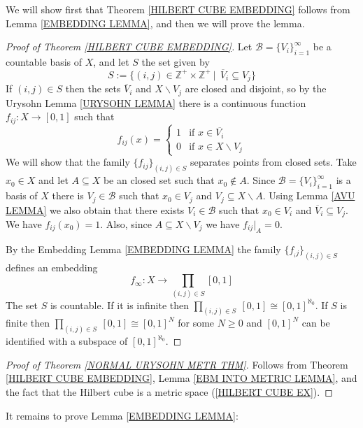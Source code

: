 \documentclass[11pt, letterpaper, oneside]{report}
\theoremstyle{pplain}
\newtheorem{ITERMVALUE THM}[theorem]{Intermediate Value Theorem}
\newtheorem{HEINEBOREL THM}[theorem]{Heine-Borel Theorem}
\newtheorem{UMETR THM}[theorem]{Urysohn Metrization Theorem}
\newtheorem{UMETR2 THM}[theorem]{Urysohn Metrization Theorem (v.2)}
\theoremstyle{ddefinition}
\theoremstyle{nnn}
\newtheorem{TDA NN}[theorem]{Topological Data Analysis. }
\theoremstyle{eexercise}
\newcommand{\Z}{{\mathbb Z}}
\newcommand{\BB}{{\mathcal B}}
\newcommand{\ssmin}{\smallsetminus}
\begin{document}
We will  show first that Theorem \ref{HILBERT CUBE EMBEDDING} follows from 
Lemma \ref{EMBEDDING LEMMA}, and then we will  prove the lemma.  


\begin{proof}[Proof of Theorem \ref{HILBERT CUBE EMBEDDING}]
Let $\BB= \{V_{i}\}_{i=1}^{\infty}$ be a countable basis of $X$, and let $S$ the set given by 
$$S := \{(i, j)\in \Z^{+}\times \Z^{+} \ | \ \ \overline{V}_{i} \subseteq V_{j} \}$$
 If $(i, j) \in S$ then the sets $\overline{V}_{i}$ and $X\ssmin V_{j}$ are closed and disjoint, 
so by the Urysohn Lemma  \ref{URYSOHN LEMMA} there is a continuous function 
$f_{ij} \colon X\to [0, 1]$ such that 
$$
f_{ij}(x) = 
\begin{cases}
1  & \text{if $x\in \overline{V_{i}}$} \\
0  & \text{if $x\in X\ssmin V_{j}$} 
\end{cases}
$$
We will show that the family $\{f_{ij}\}_{(i, j)\in S}$ separates points from closed sets. 
Take $x_{0}\in X$ and let $A\subseteq X$ be an closed  set
such that $x_{0}\not\in A$. 
Since $\BB= \{V_{i}\}_{i=1}^{\infty}$ is a basis of $X$ there is $V_{j}\in \BB$ such that 
$x_{0}\in V_{j}$ and $V_{j} \subseteq X\ssmin A$. 
Using Lemma \ref{AVU LEMMA} we also obtain that there exists 
$V_{i}\in \BB$ such that $x_{0}\in V_{i}$ and $\overline{V}_{i} \subseteq V_{j}$. We have 
$f_{ij}(x_{0}) =1$. Also, since $A\subseteq X\ssmin V_{j}$ we have $f_{ij}|_{A} = 0$. 

By the Embedding Lemma \ref{EMBEDDING LEMMA} the family $\{f_{_ij}\}_{(i, j)\in S}$  defines an  embedding 
$$f_{\infty} \colon X \to \prod_{(i, j)\in S} [0, 1]$$
The set $S$ is countable. If it is infinite then $\prod_{(i, j)\in S}\  [0, 1] \cong [0, 1]^{\aleph_{0}}$.
If $S$ is finite then $\prod_{(i, j)\in S}\  [0, 1] \cong [0, 1]^{N}$ for some $N \geq 0$ and $ [0, 1]^{N}$ can be 
identified with a subspace of $[0, 1]^{\aleph_{0}}$. 
\end{proof}

\begin{proof}[Proof of Theorem \ref{NORMAL URYSOHN METR THM}]
Follows from Theorem \ref{HILBERT CUBE EMBEDDING}, Lemma \ref{EBM INTO METRIC LEMMA}, 
and the fact that the Hilbert cube is a metric space (\ref{HILBERT CUBE EX}). 
\end{proof}

It remains to prove Lemma \ref{EMBEDDING LEMMA}:
\end{document}
